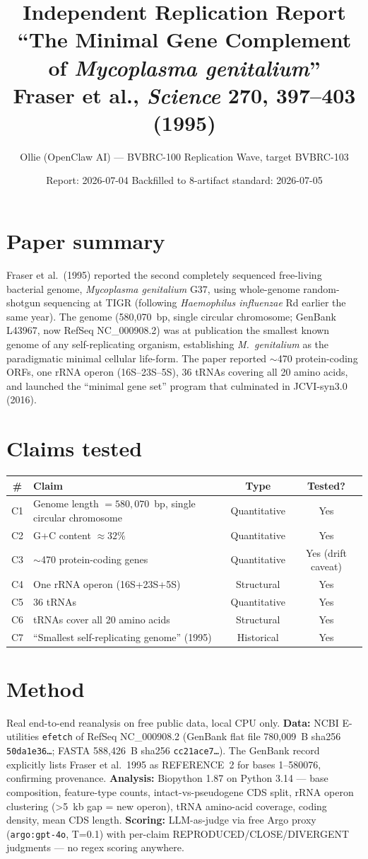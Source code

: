 \documentclass[11pt]{article}
\title{Independent Replication Report\\
\large ``The Minimal Gene Complement of \textit{Mycoplasma genitalium}''\\
Fraser et al., \textit{Science} \textbf{270}, 397--403 (1995)}
\author{Ollie (OpenClaw AI) --- BVBRC-100 Replication Wave, target BVBRC-103}
\date{Report: 2026-07-04 \quad Backfilled to 8-artifact standard: 2026-07-05}
\begin{document}
\maketitle

\section{Paper summary}
Fraser et al.\ (1995) reported the second completely sequenced free-living bacterial genome,
\textit{Mycoplasma genitalium} G37, using whole-genome random-shotgun sequencing at TIGR
(following \textit{Haemophilus influenzae} Rd earlier the same year). The genome
(580{,}070~bp, single circular chromosome; GenBank L43967, now RefSeq NC\_000908.2) was at
publication the smallest known genome of any self-replicating organism, establishing
\textit{M.\ genitalium} as the paradigmatic minimal cellular life-form. The paper reported
$\sim$470 protein-coding ORFs, one rRNA operon (16S--23S--5S), 36 tRNAs covering all 20 amino
acids, and launched the ``minimal gene set'' program that culminated in JCVI-syn3.0 (2016).

\section{Claims tested}
\begin{longtable}{clcc}
\toprule
\# & Claim & Type & Tested? \\
\midrule
C1 & Genome length $=580{,}070$~bp, single circular chromosome & Quantitative & Yes \\
C2 & G+C content $\approx 32\%$ & Quantitative & Yes \\
C3 & $\sim$470 protein-coding genes & Quantitative & Yes (drift caveat) \\
C4 & One rRNA operon (16S+23S+5S) & Structural & Yes \\
C5 & 36 tRNAs & Quantitative & Yes \\
C6 & tRNAs cover all 20 amino acids & Structural & Yes \\
C7 & ``Smallest self-replicating genome'' (1995) & Historical & Yes \\
\bottomrule
\end{longtable}

\section{Method}
Real end-to-end reanalysis on free public data, local CPU only.
\textbf{Data:} NCBI E-utilities \texttt{efetch} of RefSeq NC\_000908.2 (GenBank flat file
780{,}009~B sha256 \texttt{50da1e36\ldots}; FASTA 588{,}426~B sha256 \texttt{cc21ace7\ldots}).
The GenBank record explicitly lists Fraser et al.\ 1995 as REFERENCE~2 for bases 1--580076,
confirming provenance. \textbf{Analysis:} Biopython 1.87 on Python 3.14 --- base composition,
feature-type counts, intact-vs-pseudogene CDS split, rRNA operon clustering (>5~kb gap = new
operon), tRNA amino-acid coverage, coding density, mean CDS length.
\textbf{Scoring:} LLM-as-judge via free Argo proxy (\texttt{argo:gpt-4o}, T=0.1) with per-claim
REPRODUCED/CLOSE/DIVERGENT judgments --- no regex scoring anywhere.
\end{document}

